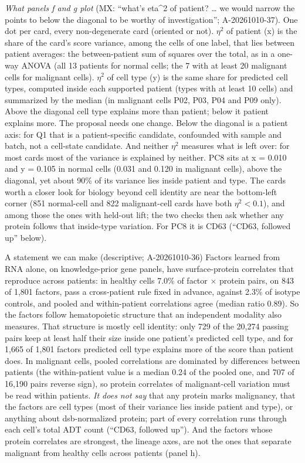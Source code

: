 \emph{What panels f and g plot} (MX: ``what's eta\textasciicircum 2 of patient? \ldots{} we would narrow the points to below the diagonal to be worthy of investigation''; A-20261010-37). One dot per card, every non-degenerate card (oriented or not). $\eta^2$ of patient (x) is the share of the card's score variance, among the cells of one label, that lies between patient averages: the between-patient sum of squares over the total, as in a one-way ANOVA (all 13 patients for normal cells; the 7 with at least 20 malignant cells for malignant cells). $\eta^2$ of cell type (y) is the same share for predicted cell types, computed inside each supported patient (types with at least 10 cells) and summarized by the median (in malignant cells P02, P03, P04 and P09 only). Above the diagonal cell type explains more than patient; below it patient explains more. The proposal needs one change. Below the diagonal is a patient axis: for Q1 that is a patient-specific candidate, confounded with sample and batch, not a cell-state candidate. And neither $\eta^2$ measures what is left over: for most cards most of the variance is explained by neither. PC8 sits at x = 0.010 and y = 0.105 in normal cells (0.031 and 0.120 in malignant cells), above the diagonal, yet about 90\% of its variance lies inside patient and type. The cards worth a closer look for biology beyond cell identity are near the bottom-left corner (851 normal-cell and 822 malignant-cell cards have both $\eta^2 < 0.1$), and among those the ones with held-out lift; the two checks then ask whether any protein follows that inside-type variation. For PC8 it is CD63 (``CD63, followed up'' below).

\begin{explainbox}{A statement we can make (descriptive; A-20261010-36)}
Factors learned from RNA alone, on knowledge-prior gene panels, have surface-protein correlates that reproduce across patients: in healthy cells 7.0\% of factor $\times$ protein pairs, on 843 of 1,801 factors, pass a cross-patient rule fixed in advance, against 2.3\% of isotype controls, and pooled and within-patient correlations agree (median ratio 0.89). So the factors follow hematopoietic structure that an independent modality also measures. That structure is mostly cell identity: only 729 of the 20,274 passing pairs keep at least half their size inside one patient's predicted cell type, and for 1,665 of 1,801 factors predicted cell type explains more of the score than patient does. In malignant cells, pooled correlations are dominated by differences between patients (the within-patient value is a median 0.24 of the pooled one, and 707 of 16,190 pairs reverse sign), so protein correlates of malignant-cell variation must be read within patients. \emph{It does not say} that any protein marks malignancy, that the factors are cell types (most of their variance lies inside patient and type), or anything about dsb-normalized protein; part of every correlation runs through each cell's total ADT count (``CD63, followed up''). And the factors whose protein correlates are strongest, the lineage axes, are not the ones that separate malignant from healthy cells across patients (panel h).
\end{explainbox}

